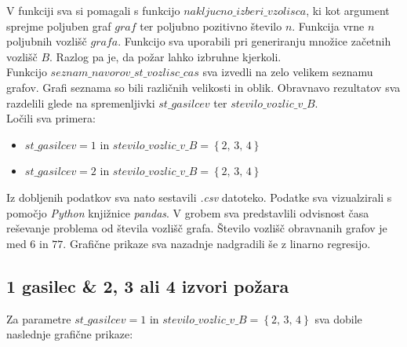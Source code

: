\documentclass[a4paper, 12pt]{article}
\begin{document}
\noindent V funkciji sva si pomagali s funkcijo $nakljucno\_izberi\_vzolisca$, ki kot 
argument sprejme poljuben graf $graf$ ter poljubno pozitivno število $n$. Funkcija vrne 
$n$ poljubnih vozlišč $grafa$. Funkcijo sva uporabili pri generiranju množice začetnih 
vozlišč $B$. Razlog pa je, da požar lahko izbruhne kjerkoli. \\

\noindent Funkcijo $seznam\_navorov\_st\_vozlisc\_cas$ sva izvedli na zelo velikem seznamu grafov. Grafi seznama
so bili različnih velikosti in oblik. Obravnavo rezultatov sva razdelili glede 
na spremenljivki $st\_gasilcev$ ter $stevilo\_vozlic\_v\_B$. \\
Ločili sva primera:
\begin{itemize}
    \item $st\_gasilcev = 1$ in $stevilo\_vozlic\_v\_B = \left\{ 2, \, 3, \, 4 \right\}$
    \item $st\_gasilcev = 2$ in $stevilo\_vozlic\_v\_B = \left\{ 2, \, 3, \, 4 \right\}$
\end{itemize}

\noindent Iz dobljenih podatkov sva nato sestavili \emph{.csv} datoteko. Podatke sva vizualzirali s pomočjo \emph{Python} knjižnice \emph{pandas}. 
V grobem sva predstavlili odvisnost časa reševanje problema od števila vozlišč grafa. Število vozlišč obravnanih grafov
je med $6$ in $77$. Grafične prikaze sva nazadnje nadgradili še z linarno regresijo. 

\pagebreak

\subsection{1 gasilec \& 2, 3 ali 4 izvori požara}

Za parametre $st\_gasilcev = 1$ in $stevilo\_vozlic\_v\_B = \left\{ 2, \, 3, \, 4 \right\}$ sva dobile
naslednje grafične prikaze:
\end{document}
